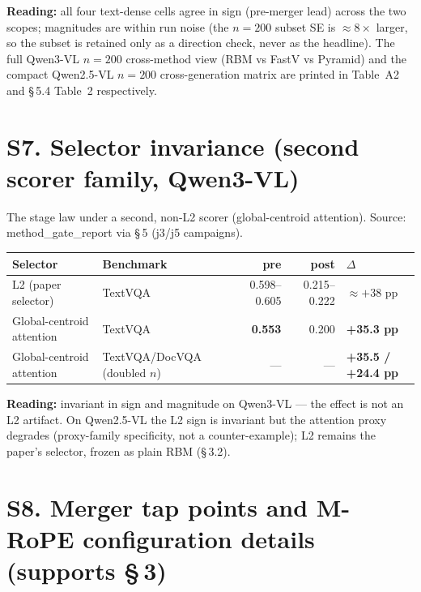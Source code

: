 \documentclass[sigconf,review,anonymous]{acmart}
\begin{document}
\noindent\textbf{Reading:} all four text-dense cells agree in sign (pre-merger
lead) across the two scopes; magnitudes are within run noise (the $n = 200$
subset SE is $\approx 8\times$ larger, so the subset is retained only as a
direction check, never as the headline). The full Qwen3-VL $n = 200$
cross-method view (RBM vs FastV vs Pyramid) and the compact Qwen2.5-VL
$n = 200$ cross-generation matrix are printed in  Table~A2 and
\S\,5.4 Table~2 respectively.

\section*{S7. Selector invariance (second scorer family, Qwen3-VL)}

The stage law under a second, non-L2 scorer (global-centroid attention).
Source: method\_gate\_report via  \S\,5 (j3/j5
campaigns).

\begin{table}[h]
  \centering
  \small
  \begin{tabular}{@{}l l r r l@{}}
    \toprule
    Selector & Benchmark & pre & post & $\Delta$ \\
    \midrule
    L2 (paper selector)         & TextVQA                       & 0.598--0.605 & 0.215--0.222 & $\approx +38$ pp \\
    Global-centroid attention   & TextVQA                       & \textbf{0.553} & 0.200 & \textbf{+35.3 pp} \\
    Global-centroid attention   & TextVQA/DocVQA (doubled $n$)  & --- & --- & \textbf{+35.5 / +24.4 pp} \\
    \bottomrule
  \end{tabular}
\end{table}

\noindent\textbf{Reading:} invariant in sign and magnitude on Qwen3-VL --- the
effect is not an L2 artifact. On Qwen2.5-VL the L2 sign is invariant but the
attention proxy degrades (proxy-family specificity, not a counter-example); L2
remains the paper's selector, frozen as plain RBM (\S\,3.2).

\section*{S8. Merger tap points and M-RoPE configuration details (supports \S\,3)}
\end{document}
